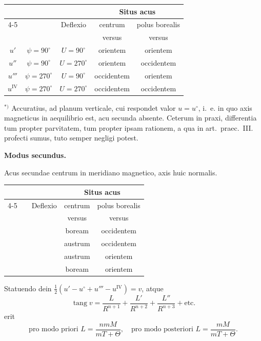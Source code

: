 \documentclass[fontsize=11pt,paper=a4,twoside,openany]{scrbook}
\DeclareMathOperator{\tang}{tang}
\begin{document}
\begin{center}
\small
\begin{tabular}{|c|c|c|c|c|}
\hline
& & & \multicolumn{2}{c|}{Situs acus} \\
\cline{4-5}
& & Deflexio & centrum & polus borealis \\
& & & versus & versus \\
\hline
$u'$ & $\psi=90^\circ$ & $U=90^\circ$ & orientem & orientem \\
$u''$ & $\psi=90^\circ$ & $U=270^\circ$ & orientem & occidentem \\
$u'''$ & $\psi=270^\circ$ & $U=90^\circ$ & occidentem & orientem \\
$u^{\mathrm{IV}}$ & $\psi=270^\circ$ & $U=270^\circ$ & occidentem & occidentem \\
\hline
\end{tabular}
\end{center}

$^{*)}$ Accuratius, ad planum verticale, cui respondet valor $u=u^{\circ}$, i.~e. in quo axis magneticus in aequilibrio est, acu secunda absente. Ceterum in praxi, differentia tum propter parvitatem, tum propter ipsam rationem, a qua in art.~praec.~III. profecti sumus, tuto semper negligi potest.

\medskip
\textbf{Modus secundus.}

Acus secundae centrum in meridiano magnetico, axis huic normalis.

\begin{center}
\small
\begin{tabular}{|c|c|c|c|c|}
\hline
& & & \multicolumn{2}{c|}{Situs acus} \\
\cline{4-5}
& & Deflexio & centrum & polus borealis \\
& & & versus & versus \\
\hline
& & & boream & occidentem \\
& & & austrum & occidentem \\
& & & austrum & orientem \\
& & & boream & orientem \\
\hline
\end{tabular}
\end{center}

Statuendo dein $\frac{1}{2}(u'-u^{\circ}+u'''-u^{\mathrm{IV}}) = v$, atque
\[
\tang v = \frac{L}{R^{n+1}} + \frac{L'}{R^{n+2}} + \frac{L''}{R^{n+3}} + \text{etc.}
\]
erit
\[
\text{pro modo priori } L = \frac{nmM}{mT+\Theta},\quad
\text{pro modo posteriori } L = \frac{mM}{mT+\Theta}.
\]
\end{document}
